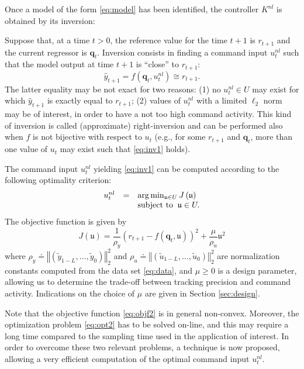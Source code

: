 \documentclass[twocolumn,english,journal]{IEEEtran}
\begin{document}
Once a model of the form \eqref{eq:model} has been identified, the
controller $K^{nl}$ is obtained by its inversion:

Suppose that, at a time $t>0$, the reference value for the time $t+1$
is $r_{t+1}$ and the current regressor is $\boldsymbol{q}_{t}$.
Inversion consists in finding a command input $u_{t}^{nl}$ such that
the model output at time $t+1$ is ``close'' to $r_{t+1}$: 
\begin{equation}
\hat{y}_{t+1}=f\left(\boldsymbol{q}_{t},u_{t}^{nl}\right)\cong r_{t+1}.\label{eq:inv1}
\end{equation}
The latter equality may be not exact for two reasons: (1) no $u_{t}^{nl}\in U$
may exist for which $\hat{y}_{t+1}$ is exactly equal to $r_{t+1}$;
(2) values of $u_{t}^{nl}$ with a limited $\ell_{2}$ norm may be
of interest, in order to have a not too high command activity. This
kind of inversion is called (approximate) right-inversion and can
be performed also when $f$ is not bijective with respect to $u_{t}$
(e.g., for some $r_{t+1}$ and $\boldsymbol{q}_{t}$, more than one
value of $u_{t}$ may exist such that \eqref{eq:inv1} holds).

The command input $u_{t}^{nl}$ yielding \eqref{eq:inv1} can be computed
according to the following optimality criterion: 
\begin{equation}
\begin{array}[t]{ccl}
u_{t}^{nl} & = & \arg\min_{\mathfrak{u}\in U}J\left(\mathfrak{u}\right)\\
 &  & \textrm{subject to}\;\;\mathfrak{u}\in U.
\end{array}\label{eq:opt2}
\end{equation}
The objective function is given by
\begin{equation}
J\left(\mathfrak{u}\right)=\frac{1}{\rho_{y}}\left(r_{t+1}-f\left(\boldsymbol{q}_{t},\mathfrak{u}\right)\right)^{2}+\frac{\mu}{\rho_{u}}\mathfrak{u}^{2}\label{eq:objf2}
\end{equation}
where $\rho_{y}\doteq\left\Vert \left(\tilde{y}_{1-L},\ldots,\tilde{y}_{0}\right)\right\Vert _{2}^{2}$
and $\rho_{u}\doteq\left\Vert \left(\tilde{u}_{1-L},\ldots,\tilde{u}_{0}\right)\right\Vert _{2}^{2}$
are normalization constants computed from the data set \eqref{eq:data},
and $\mu\geq0$ is a design parameter, allowing us to determine the
trade-off between tracking precision and command activity. Indications
on the choice of $\mu$ are given in Section \ref{sec:design}.

Note that the objective function \eqref{eq:objf2} is in general non-convex.
Moreover, the optimization problem \eqref{eq:opt2} has to be solved
on-line, and this may require a long time compared to the sampling
time used in the application of interest. In order to overcome these
two relevant problems, a technique is now proposed, allowing a very
efficient computation of the optimal command input $u_{t}^{nl}$.
\end{document}
